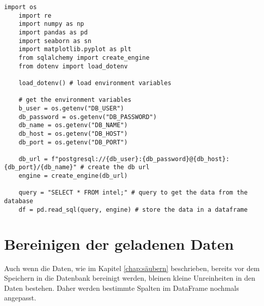 \lstset{
	breaklines=true,         %
	breakatwhitespace=false, %
	basicstyle=\ttfamily,    %
}

\begin{lstlisting}[caption={\texttt{load data from the database}},captionpos=b]
    import os
    import re
    import numpy as np
    import pandas as pd
    import seaborn as sn
    import matplotlib.pyplot as plt
    from sqlalchemy import create_engine
    from dotenv import load_dotenv

    load_dotenv() # load environment variables

    # get the environment variables
    b_user = os.getenv("DB_USER")
    db_password = os.getenv("DB_PASSWORD")
    db_name = os.getenv("DB_NAME")
    db_host = os.getenv("DB_HOST")
    db_port = os.getenv("DB_PORT")

    db_url = f"postgresql://{db_user}:{db_password}@{db_host}:{db_port}/{db_name}" # create the db url
    engine = create_engine(db_url)

    query = "SELECT * FROM intel;" # query to get the data from the database
    df = pd.read_sql(query, engine) # store the data in a dataframe
\end{lstlisting}

\section{Bereinigen der geladenen Daten}
Auch wenn die Daten, wie im Kapitel \ref{chap:säubern} beschrieben, bereits vor dem Speichern in die Datenbank bereinigt werden, bleinen kleine
Unreinheiten in den Daten bestehen. Daher werden bestimmte Spalten im DataFrame nochmals angepasst.

